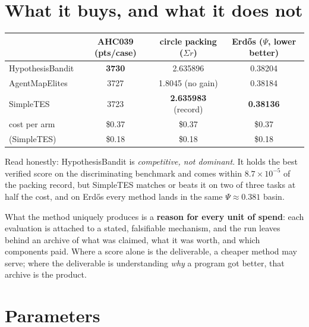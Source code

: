 \documentclass[11pt]{article}
\begin{document}
\section{What it buys, and what it does not}

\begin{center}
\begin{tabular}{lccc}
\toprule
 & AHC039 (pts/case) & circle packing ($\Sigma r$) & Erd\H{o}s ($\Psi$, lower better) \\
\midrule
HypothesisBandit & \textbf{3730} & 2.635896 & 0.38204 \\
AgentMapElites   & 3727 & 1.8045 (no gain) & 0.38184 \\
SimpleTES        & 3723 & \textbf{2.635983} (record) & \textbf{0.38136} \\
\midrule
cost per arm     & \$0.37 & \$0.37 & \$0.37 \\
(SimpleTES)      & \$0.18 & \$0.18 & \$0.18 \\
\bottomrule
\end{tabular}
\end{center}

\noindent Read honestly: HypothesisBandit is \emph{competitive, not dominant}. It holds the best
verified score on the discriminating benchmark and comes within $8.7\times10^{-5}$ of the packing
record, but SimpleTES matches or beats it on two of three tasks at half the cost, and on Erd\H{o}s
every method lands in the same $\Psi \approx 0.381$ basin.

What the method uniquely produces is a \textbf{reason for every unit of spend}: each evaluation is
attached to a stated, falsifiable mechanism, and the run leaves behind an archive of what was
claimed, what it was worth, and which components paid. Where a score alone is the deliverable, a
cheaper method may serve; where the deliverable is understanding \emph{why} a program got better,
that archive is the product.

\section{Parameters}
\end{document}
